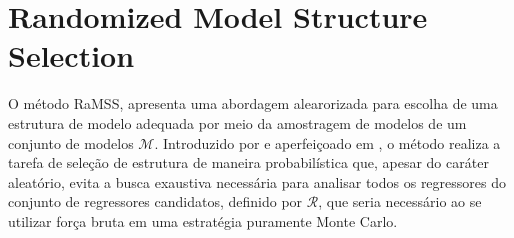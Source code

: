 
\section{Randomized Model Structure Selection}%
\label{sec:ramss}


O método RaMSS, apresenta uma abordagem alearorizada para escolha de uma estrutura de modelo adequada por meio da amostragem de modelos de um conjunto de modelos $\mathscr{M}$. 
Introduzido por \cite{falsone2014} e aperfeiçoado em \citep{falsone2015}, o método realiza a tarefa de seleção de estrutura de maneira probabilística que, apesar do caráter aleatório, evita a busca exaustiva necessária para analisar todos os regressores do conjunto de regressores candidatos, definido por $\mathscr{R}$, que seria necessário ao se utilizar força bruta em uma estratégia puramente Monte Carlo. 

